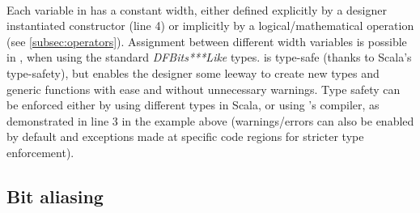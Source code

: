 \paragraph{}Each variable in \cf has a constant width, either defined explicitly by a designer instantiated constructor (line 4) or implicitly by a logical/mathematical operation (see \autoref{subsec:operators}). Assignment between different width variables is possible in \cfns, when using the standard \textit{DFBits***Like} types. \cf is type-safe (thanks to Scala's type-safety), but enables the designer some leeway to create new types and generic functions with ease and without unnecessary warnings. Type safety can be enforced either by using different types in Scala, or using \cfns's compiler, as demonstrated in line 3 in the example above (warnings/errors can also be enabled by default and exceptions made at specific code regions for stricter type enforcement). 



\subsection{Bit aliasing}
\label{subsec:bit_alias}
